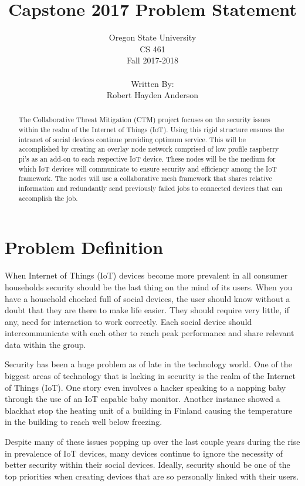 \documentclass[draftclsnofoot, onecolumn, 10pt]{IEEEtran}
\title{\huge Capstone 2017 Problem Statement}
\author{Oregon State University\\CS 461\\Fall 2017-2018\\\\Written By:\\Robert Hayden Anderson}
\begin{document}
\begin{titlingpage}
    \maketitle 
    \begin{abstract}
		\noindent 
The Collaborative Threat Mitigation (CTM) project focuses on the security issues within the realm of the Internet of Things (IoT).  Using this rigid structure ensures the intranet of social devices continue providing optimum service.  This will be accomplished by creating an overlay node network comprised of low profile raspberry pi’s as an add-on to each respective IoT device.  These nodes will be the medium for which IoT devices will communicate to ensure security and efficiency among the IoT framework. The nodes will use a collaborative mesh framework that shares relative information and redundantly send previously failed jobs to connected devices that can accomplish the job.
    
    \end{abstract}
\end{titlingpage}

\section*{Problem Definition}
When Internet of Things (IoT) devices become more prevalent in all consumer households security should be the last thing on the mind of its users.  When you have a household chocked full of social devices, the user should know without a doubt that they are there to make life easier. They should require very little, if any, need for interaction to work correctly.  Each social device should intercommunicate with each other to reach peak performance and share relevant data within the group.

Security has been a huge problem as of late in the technology world.  One of the biggest areas of technology that is lacking in security is the realm of the Internet of Things (IoT).  One story even involves a hacker speaking to a napping baby through the use of an IoT capable baby monitor. Another instance showed a blackhat stop the heating unit of a building in Finland causing the temperature in the building to reach well below freezing.  

Despite many of these issues popping up over the last couple years during the rise in prevalence of IoT devices, many devices continue to ignore the necessity of better security within their social devices. Ideally, security should be one of the top priorities when creating devices that are so personally linked with their users.
\end{document}
